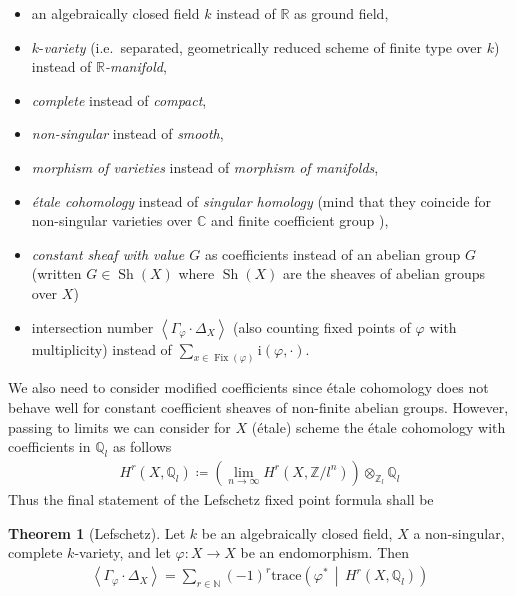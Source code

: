 \documentclass[english]{scrartcl}
\theoremstyle{definition}
\newtheorem{Thm}[Def]{Theorem}
\theoremstyle{remark}
\newcommand*{\N}{\mathds{N}}
\newcommand*{\Z}{\mathds{Z}}
\newcommand*{\Q}{\mathds{Q}}
\newcommand*{\R}{\mathds{R}}
\newcommand*{\C}{\mathds{C}}
\newcommand*{\Zmod}[1]{\Z/#1} %
\newcommand*{\Zl}{\Z_l} %
\newcommand*{\Ql}{\Q_l} %
\DeclareMathOperator{\Sh}{Sh} %
\newcommand*{\idest}{i.e.\ }
\newcommand*{\intProd}[2]{{#1\cdot#2}} %
\newcommand*{\intNum}[1]{{\left\langle{#1}\right\rangle}} %
\newcommand*{\Graph}[1]{{\Gamma_{#1}}} %
\newcommand*{\Diag}[1]{{\Delta_{#1}}} %
\newcommand*{\trace}[2]{{\text{trace}\left(#1 \,\middle|\, #2 \right)}} %
\renewcommand*{\phi}{\varphi}
\begin{document}
\begin{itemize}
\item an algebraically closed field $k$ instead of $\R$ as ground field,
\item $k$-\emph{variety}
  (\idest separated, geometrically reduced scheme of finite type over $k$)
  instead of \emph{$\R$-manifold},
\item \emph{complete} instead of \emph{compact},
\item \emph{non-singular} instead of \emph{smooth},
\item \emph{morphism of varieties} instead of \emph{morphism of manifolds},
\item \emph{étale cohomology} instead of \emph{singular homology}
  (mind that they coincide for non-singular varieties over $\C$ and
  finite coefficient group \cite[see][Thm.~21.1]{milne}),
\item \emph{constant sheaf with value $G$}
  as coefficients instead of an abelian group $G$
  (written $G\in\Sh(X)$ where
  $\Sh(X)$ are the sheaves of abelian groups over $X$)
\item intersection number $\intNum{\intProd{\Graph{\phi}}{\Diag{X}}}$
  (also counting fixed points of $\phi$ with multiplicity)
  instead of $\sum_{x\in\operatorname{Fix}(\phi)}\mathrm{i}(\phi,\cdot)$.
\end{itemize}
We also need to consider modified coefficients since étale cohomology
does not behave well for constant coefficient sheaves of non-finite
abelian groups. However, passing to limits we can consider for $X$
(étale) scheme the étale cohomology with coefficients in $\Ql$ as follows
\begin{gather*}
  H^r(X,\Ql)\coloneqq
  \left(\lim_{n\to\infty}H^r(X,\Zmod{l^n})\right)\otimes_{\Zl}\Ql
\end{gather*}
Thus the final statement of the Lefschetz fixed point formula shall be
\begin{Thm}[Lefschetz]\label{lefschetzthm:motivation}
  Let $k$ be an algebraically closed field, $X$ a non-singular,
  complete $k$-variety, and let $\phi\colon X\to X$ be an
  endomorphism. Then
  \begin{gather*}
    \intNum{\intProd{\Graph{\phi}}{\Diag{X}}}
    = \sum_{r\in\N}(-1)^r\trace{\phi^*}{H^r(X,\Ql)}
  \end{gather*}
\end{Thm}
\end{document}
